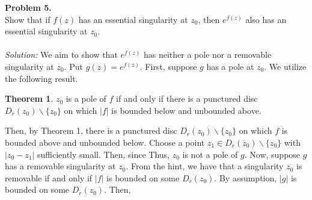 \documentclass[12pt]{article}
\theoremstyle{definition}
\newcounter{customThm}
\renewcommand{\thecustomThm}{\arabic{customThm}}
\newtheorem{theorem}[customThm]{Theorem}
\theoremstyle{named}
\begin{document}
\textbf{Problem 5.}
\\
Show that if $f(z)$ has an essential singularity at $z_0$, then $e^{f(z)}$ also has an essential singularity at $z_0$.
\\
\\
\textit{Solution:} We aim to show that $e^{f(z)}$ has neither a pole nor a removable singularity at $z_0$. Put $g(z) = e^{f(z)}$. First, suppose $g$ has a pole at $z_0$. We utilize the following result.

\renewcommand{\thecustomThm}{1}
\begin{theorem}
$z_0$ is a pole of $f$ if and only if there is a punctured disc $D_r(z_0)\backslash\{z_0\}$ on which $|f|$ is bounded below and unbounded above. 
\end{theorem}

Then, by Theorem 1, there is a punctured disc $D_r(z_0)\backslash\{z_0\}$ on which $f$ is bounded above and unbounded below. Choose a point $z_1 \in D_r(z_0)\backslash\{z_0\}$ with $|z_0 - z_1|$ sufficiently small. Then, since Thus, $z_0$ is not a pole of $g$. Now, suppose $g$ has a removable singularity at $z_0$. From the hint, we have that a singularity $z_0$ is removable if and only if $|f|$ is bounded on some $D_r(z_0)$. By assumption, $|g|$ is bounded on some $D_r(z_0)$. Then, 

 
\end{document}
